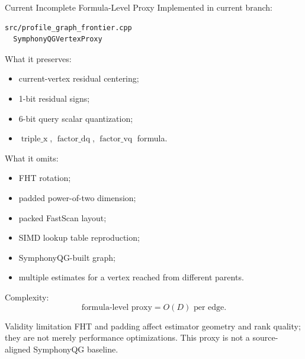\documentclass[aspectratio=169,10pt]{beamer}
\begin{document}
\begin{frame}[fragile]{Current Incomplete Formula-Level Proxy}
\small
Implemented in current branch:
\begin{lstlisting}
src/profile_graph_frontier.cpp
  SymphonyQGVertexProxy
\end{lstlisting}

What it preserves:
\begin{itemize}
  \item current-vertex residual centering;
  \item 1-bit residual signs;
  \item 6-bit query scalar quantization;
  \item \(\operatorname{triple\_x}\), \(\operatorname{factor\_dq}\), \(\operatorname{factor\_vq}\) formula.
\end{itemize}

What it omits:
\begin{itemize}
  \item FHT rotation;
  \item padded power-of-two dimension;
  \item packed FastScan layout;
  \item SIMD lookup table reproduction;
  \item SymphonyQG-built graph;
  \item multiple estimates for a vertex reached from different parents.
\end{itemize}

Complexity:
\[
\text{formula-level proxy}=O(D)\text{ per edge}.
\]

\begin{alertblock}{Validity limitation}
FHT and padding affect estimator geometry and rank quality; they are not merely
performance optimizations. This proxy is not a source-aligned SymphonyQG
baseline.
\end{alertblock}
\end{frame}
\end{document}
